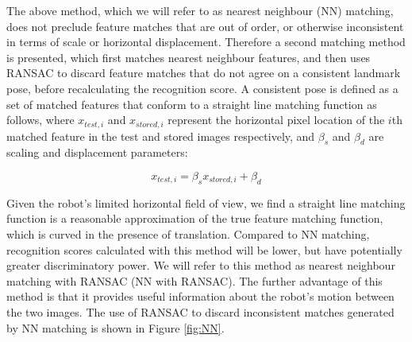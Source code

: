 \documentclass[runningheads,a4paper]{llncs}
\begin{document}
The above method, which we will refer to as nearest neighbour (NN) matching, does not preclude feature matches that are out of order, or otherwise inconsistent in terms of scale or horizontal displacement. Therefore a second matching method is presented, which first matches nearest neighbour features, and then uses RANSAC \cite{RANSAC} to discard feature matches that do not agree on a consistent landmark pose, before recalculating the recognition score. A consistent pose is defined as a set of matched features that conform to a straight line matching function as follows, where $x_{test,i}$ and $x_{stored,i}$ represent the horizontal pixel location of the $i$th matched feature in the test and stored images respectively, and $\beta_s$ and $\beta_d$ are scaling and displacement parameters: 

\begin{equation} \label{eq:1}
x_{test,i} = \beta_s x_{stored,i} + \beta_d
\end{equation}

\noindent
Given the robot's limited horizontal field of view, we find a straight line matching function is a reasonable approximation of the true feature matching function, which is curved in the presence of translation. Compared to NN matching, recognition scores calculated with this method will be lower, but have potentially greater discriminatory power. We will refer to this method as nearest neighbour matching with RANSAC (NN with RANSAC). The further advantage of this method is that it provides useful information about the robot's motion between the two images. The use of RANSAC to discard inconsistent matches generated by NN matching is shown in Figure \ref{fig:NN}.
\end{document}
